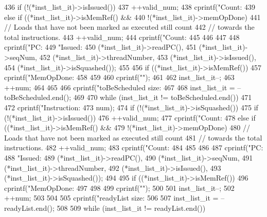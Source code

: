 \begin{DoxyCode}
{{{436             if (!(*inst_list_it)->isIssued()) {
437                 ++valid_num;
438                 cprintf("Count:%
439             } else if ((*inst_list_it)->isMemRef() &&
440                        !(*inst_list_it)->memOpDone) {
441                 // Loads that have not been marked as executed still count
442                 // towards the total instructions.
443                 ++valid_num;
444                 cprintf("Count:%
445             }
446         }
447 
448         cprintf("PC:%
449                 "Issued:%
450                 (*inst_list_it)->readPC(),
451                 (*inst_list_it)->seqNum,
452                 (*inst_list_it)->threadNumber,
453                 (*inst_list_it)->isIssued(),
454                 (*inst_list_it)->isSquashed());
455 
456         if ((*inst_list_it)->isMemRef()) {
457             cprintf("MemOpDone:%
458         }
459 
460         cprintf("\n");
461 
462         inst_list_it--;
463         ++num;
464     }
465 
466     cprintf("toBeScheduled size: %
467 
468     inst_list_it = --toBeScheduled.end();
469 
470     while (inst_list_it != toBeScheduled.end())
471     {
472         cprintf("Instruction:%
473                 num);
474         if (!(*inst_list_it)->isSquashed()) {
475             if (!(*inst_list_it)->isIssued()) {
476                 ++valid_num;
477                 cprintf("Count:%
478             } else if ((*inst_list_it)->isMemRef() &&
479                        !(*inst_list_it)->memOpDone) {
480                 // Loads that have not been marked as executed still count
481                 // towards the total instructions.
482                 ++valid_num;
483                 cprintf("Count:%
484             }
485         }
486 
487         cprintf("PC:%
488                 "Issued:%
489                 (*inst_list_it)->readPC(),
490                 (*inst_list_it)->seqNum,
491                 (*inst_list_it)->threadNumber,
492                 (*inst_list_it)->isIssued(),
493                 (*inst_list_it)->isSquashed());
494 
495         if ((*inst_list_it)->isMemRef()) {
496             cprintf("MemOpDone:%
497         }
498 
499         cprintf("\n");
500 
501         inst_list_it--;
502         ++num;
503     }
504 
505     cprintf("readyList size: %
506 
507     inst_list_it = --readyList.end();
508 
509     while (inst_list_it != readyList.end())
}
\end{DoxyCode}
